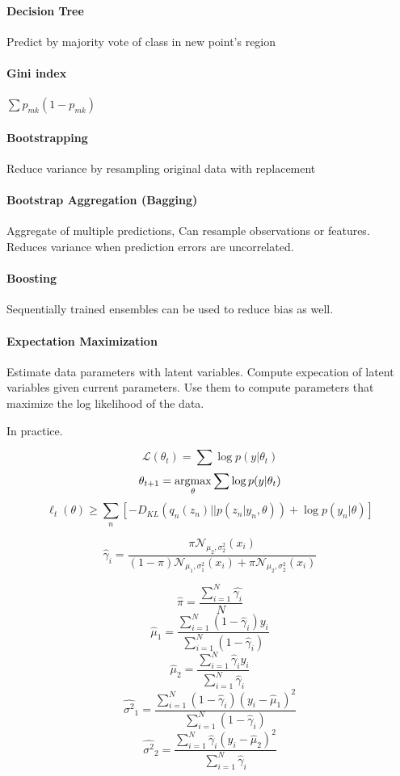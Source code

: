 \documentclass[11pt]{article}
\begin{document}
\paragraph{Decision Tree}

Predict by majority vote of class in new point's region

\paragraph{Gini index} $\sum p_{mk} (1 - p_{mk})$

\paragraph{Bootstrapping} Reduce variance by resampling original data with replacement

\paragraph{Bootstrap Aggregation (Bagging)} Aggregate of multiple predictions, Can resample observations or features. Reduces variance when prediction errors are uncorrelated.

\paragraph{Boosting} Sequentially trained ensembles can be used to reduce bias as well. 

\paragraph{Expectation Maximization}

Estimate data parameters with latent variables. Compute expecation of latent variables given current parameters. Use them to compute parameters that maximize the log likelihood of the data.

In practice.

$$\mathcal{L}(\theta_t) = \sum \log p(y | \theta_t)$$
$$\theta_{t+1} = \operatorname*{arg max}_{\theta} \sum \log p(y | \theta_t)$$
$$\ell_t(\theta) \geq \sum_n \left[ - D_{KL} (q_n(z_n) || p(z_n | y_n, \theta)) + \log p(y_n | \theta) \right]$$


$$\hat{\gamma}_i = \dfrac{\pi \mathcal{N}_{\mu_2, \sigma_2^2} (x_i)}{(1 - \pi) \mathcal{N}_{\mu_1, \sigma_1^2} (x_i) + \pi \mathcal{N}_{\mu_2, \sigma_2^2} (x_i)}$$

$$\hat{\pi} = \frac{\sum_{i=1}^N \hat{\gamma_i}}{N}$$
$$\hat{\mu}_1 = \frac{\sum_{i=1}^N (1 - \hat{\gamma}_i) y_i}{\sum_{i=1}^N (1 - \hat{\gamma}_i)}$$
$$\hat{\mu}_2 = \frac{\sum_{i=1}^N \hat{\gamma}_i y_i}{\sum_{i=1}^N \hat{\gamma}_i}$$
$$\hat{\sigma^2}_1 = \frac{\sum_{i=1}^N (1 - \hat{\gamma}_i) (y_i - \hat{\mu}_1)^2}{\sum_{i=1}^N (1 - \hat{\gamma}_i)} $$
$$\hat{\sigma^2}_2 = \frac{\sum_{i=1}^N \hat{\gamma}_i (y_i - \hat{\mu}_2)^2}{\sum_{i=1}^N \hat{\gamma}_i} $$
\end{document}
